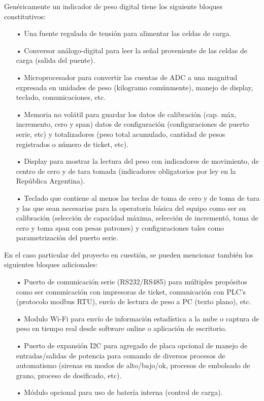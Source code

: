 \documentclass[11pt]{charter}
\begin{document}
Genéricamente un indicador de peso digital tiene los siguiente bloques constitutivos:
\begin{itemize} 
\item[•] Una fuente regulada de tensión para alimentar las celdas de carga.
\item[•] Conversor análogo-digital para leer la señal proveniente de las celdas de carga (salida del puente).
\item[•] Microprocesador para convertir las cuentas de ADC a una magnitud expresada en unidades de peso (kilogramo comúnmente), manejo de display, teclado, comunicaciones, etc.
\item[•] Memoria no volátil para guardar los datos de calibración (cap. máx, incremento, cero y span) datos de configuración (configuraciones de puerto serie, etc) y totalizadores (peso total acumulado, cantidad de pesos registrados o número de ticket, etc).
\item[•] Display para mostrar la lectura del peso con indicadores de movimiento, de centro de cero y de tara tomada (indicadores obligatorios por ley en la República Argentina).
\item[•] Teclado que contiene al menos las teclas de toma de cero y de toma de tara y las que sean necesarias para la operatoria básica del equipo como ser su calibración (selección de capacidad máxima, selección de incrementó, toma de cero y toma span con pesas patrones) y configuraciones tales como parametrización del puerto serie.
\end{itemize}

En el caso particular del proyecto en cuestión, se pueden mencionar también los siguientes bloques adicionales:
\begin{itemize}
\item[•]Puerto de comunicación serie (RS232/RS485) para múltiples propósitos como ser comunicación con impresoras de ticket, comunicación con PLC’s (protocolo modbus RTU), envío de lectura de peso a PC (texto plano), etc.
\item[•]Modulo Wi-Fi para envío de información estadística a la nube o captura de peso en tiempo real  desde software online o aplicación de escritorio.
\item[•]Puerto de expansión I2C para agregado de placa opcional de manejo de entradas/salidas de potencia para comando de diversos procesos de automatismo (sirenas en modos de alto/bajo/ok, procesos de embolsado de grano, proceso de dosificado, etc).
\item[•]Módulo opcional para uso de batería interna (control de carga).
\end{itemize}
\end{document}
